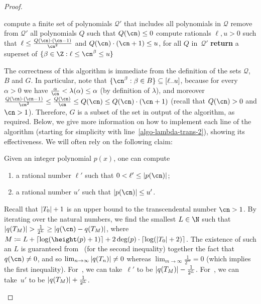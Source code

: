 \begin{proof}
    \begin{algorithmic}[1]
        \State\label{algo-lambda-trans-1} compute a finite set of polynomials $\mathcal{Q}'$ that includes all polynomials in $\mathcal{Q}$
        \State\label{algo-lambda-trans-2} remove from $\mathcal{Q}'$ all polynomials $Q$ such that $Q(\cn) \leq 0$
        \State\label{algo-lambda-trans-3} compute rationals $\ell,u > 0$ such that~$\ell \leq \frac{Q(\cn)\cdot (\cn-1)}{\cn^2}$ and $Q(\cn) \cdot (\cn+1) \leq u$, for all $Q$ in~$\mathcal{Q}'$
        \State\label{algo-lambda-trans-4} \textbf{return} a superset of $\{ \beta \in \Z : \ell \leq \cn^\beta \leq u \}$
    \end{algorithmic}
    The correctness of this algorithm is immediate from the definition of the sets $\mathcal{Q}$, $B$ and $G$. 
    In particular, note that $\{ \cn^\beta : \beta \in B\} \subseteq [\ell..u]$, 
    because for every $\alpha > 0$ we have $\frac{\alpha}{\cn} < \lambda(\alpha) \leq \alpha$ (by definition of $\lambda$), and moreover 
    $\frac{Q(\cn) \cdot (\cn-1)}{\cn^2} \leq \frac{Q(\cn)}{\cn} \leq Q(\cn) \leq Q(\cn)\cdot (\cn+1)$ (recall that $Q(\cn) > 0$ and $\cn > 1$). Therefore, $G$ is a subset of the set in output of the algorithm, as required. Below, we give more information on how to implement each line of the algorithm (starting for simplicity with line~\ref{algo-lambda-trans-2}), showing its effectiveness. We will often rely on the following claim:

    \begin{claim}\label{claim:lu-p}
      Given an integer polynomial $p(x)$, one can compute 
      \begin{enumerate}
        \item\label{claim:lu-p:i1} a rational number $\ell'$ such that $0 <
        \ell' \leq \abs{p(\cn)}$;
        \item\label{claim:lu-p:i2} a rational number $u'$ such that $\abs{p(\cn)}
        \leq u'$.
      \end{enumerate}
    \end{claim}

    \begin{claimproof}
      Recall that $\left|T_0\right|+1$ is an upper bound to the transcendental number $\cn > 1$. 
      By iterating over the natural numbers, we find the smallest $L \in \N$ 
      such that 
      $\abs{q(T_M)} > \frac{1}{2^L} \geq \abs{q(\cn) - q(T_M)}$, 
      where $M \coloneqq L + \ceil{\log(\height(p)+1)} + 2 \deg(p) \cdot \ceil{\log(\abs{T_0}+2)}$.
      The existence of such an $L$ is guaranteed from~ (for the second inequality) together the fact that $q(\cn) \neq 0$, and so $\lim_{n \to \infty} \left|q(T_n)\right| \neq 0$ whereas $\lim_{m \to \infty} \frac{1}{2^m} = 0$
      (which implies the first inequality).
      For~, we can take~$\ell'$ to be $\left|q(T_M)\right| - \frac{1}{2^L}$.
      For~, we can take~$u'$ to be $\left|q(T_M)\right| + \frac{1}{2^L}$.
    \end{claimproof}
    

\end{proof}
